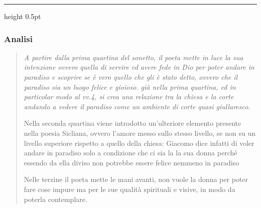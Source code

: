 \vspace{0.5em}
{\color{Tomato!40}\hrule height 0.5pt}
\vspace{1em}

\subsubsection*{Analisi}
\begin{quote}
\small \itshape
A partire dalla prima quartina del sonetto, il poeta mette in luce la sua intenzione ovvero quella di servire ed avere fede in Dio per poter andare in paradiso e scoprire se è vero quello che gli è stato detto, ovvero che il paradiso sia un luogo felice e gioioso. già nella prima quartina, ed in particolar modo al vv.4, si crea una relazione tra la chiesa e la corte andando a vedere il paradiso come un ambiente di corte quasi giullaresco.

Nella seconda quartina viene introdotto un'ulteriore elemento presente nella poesia Sicliana, ovvero l'amore messo sullo stesso livello, se non su un livello superiore rispetto a quello della chiesa: Giacomo dice infatti di voler andare in paradiso solo a condizione che ci sia la la sua donna perché essendo da ella diviso non potrebbe essere felice nemmeno in paradiso

Nelle terzine il poeta mette le mani avanti, non vuole la donna per poter fare cose impure ma per le sue qualità spirituali e visive, in modo da poterla contemplare.
\end{quote}